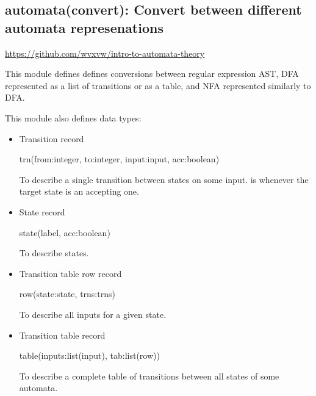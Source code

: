 \subsection{automata(convert): Convert between different automata represenations}

\label{sec:convert}

\begin{tags}
\url{https://github.com/wvxvw/intro-to-automata-theory}
\end{tags}

This module defines defines conversions between regular expression
AST, DFA represented as a list of transitions or as a table, and NFA
represented similarly to DFA.

This module also defines data types:

\begin{itemize}
    \item Transition record

\begin{code}
trn(from:integer, to:integer, input:input, acc:boolean)
\end{code}

To describe a single transition between states on some input.
 is  whenever the target state is an accepting one.
    \item State record

\begin{code}
state(label, acc:boolean)
\end{code}

To describe states.
    \item Transition table row record

\begin{code}
row(state:state, trns:trns)
\end{code}

To describe all inputs for a given state.
    \item Transition table record

\begin{code}
table(inputs:list(input), tab:list(row))
\end{code}

To describe a complete table of transitions between all states
of some automata.
\end{itemize}

\vspace{0.7cm}


